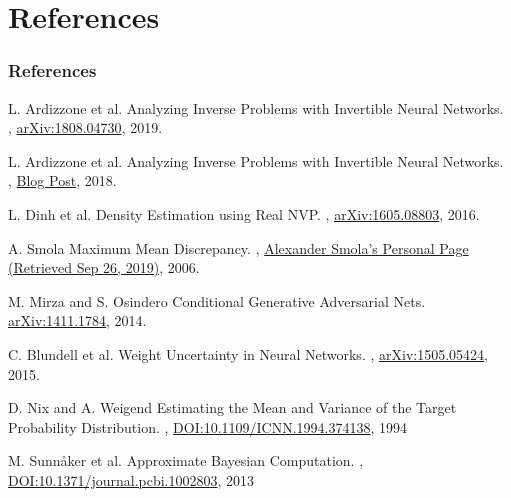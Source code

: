 \documentclass[aspectratio=43]{beamer}
\begin{document}
\appendix
\section*{References}
\begin{frame}[allowframebreaks]
\frametitle{References}
	\begin{thebibliography}{10}
		

	  
	   
		  
		\beamertemplatearticlebibitems
	  
		  L. Ardizzone et al.
		  \newblock Analyzing Inverse Problems with Invertible Neural Networks.
		  , \href{https://arxiv.org/abs/1808.04730}{arXiv:1808.04730},
		  2019.
		
		  L. Ardizzone et al.
		  \newblock Analyzing Inverse Problems with Invertible Neural Networks.
		  , \href{https://hci.iwr.uni-heidelberg.de/vislearn/inverse-problems-invertible-neural-networks/}{Blog Post},
		  2018.

		  L. Dinh et al.
		  \newblock Density Estimation using Real NVP.
		  , \href{https://arxiv.org/abs/1605.08803}{arXiv:1605.08803},
		  2016.
	
		  A. Smola
		  \newblock Maximum Mean Discrepancy.
		  , \href{http://alex.smola.org/teaching/iconip2006/iconip_3.pdf}{Alexander Smola's Personal Page (Retrieved Sep 26, 2019)},
		  2006.

		  M. Mirza and S. Osindero
		  \newblock Conditional Generative Adversarial Nets.
		  \newblock \href{https://arxiv.org/abs/1411.1784}{arXiv:1411.1784},
		  2014. 
		 
		  C. Blundell et al.
		  \newblock Weight Uncertainty in Neural Networks.
		  , \href{https://arxiv.org/abs/1505.05424}{arXiv:1505.05424},
		  2015.

		  D. Nix and A. Weigend
		  \newblock Estimating the Mean and Variance of the Target Probability Distribution.
		  , \href{https://doi.org/10.1109/ICNN.1994.374138}{DOI:10.1109/ICNN.1994.374138},
		  1994

		  M. Sunn\aa ker et al.
		  \newblock Approximate Bayesian Computation.
		  , \href{https://doi.org/10.1371/journal.pcbi.1002803}{DOI:10.1371/journal.pcbi.1002803},
		  2013

	\end{thebibliography}

\end{frame}
\end{document}
